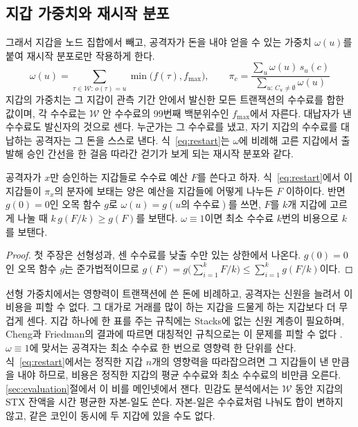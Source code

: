 \subsection{지갑 가중치와 재시작 분포}
\label{sec:method-weights}

그래서 지갑을 노드 집합에서 빼고, 공격자가 돈을 내야 얻을 수 있는 가중치 $\omega(u)$를 붙여 재시작 분포로만 작용하게 한다.
\begin{equation}
\label{eq:restart}
\omega(u)=\sum_{\tau\in\mathcal{W}:\,o(\tau)=u}\min\bigl(f(\tau),f_{\max}\bigr),
\qquad
\pi_c=\frac{\sum_{u}\omega(u)\,s_u(c)}{\sum_{u:\,C_u\neq\emptyset}\omega(u)}
\end{equation}
지갑의 가중치는 그 지갑이 관측 기간 안에서 발신한 모든 트랜잭션의 수수료를 합한 값이며, 각 수수료는 $\mathcal{W}$ 안 수수료의 99번째 백분위수인 $f_{\max}$에서 자른다. 대납자가 낸 수수료도 발신자의 것으로 센다. 누군가는 그 수수료를 냈고, 자기 지갑의 수수료를 대납하는 공격자는 그 돈을 스스로 낸다. 식~\eqref{eq:restart}는 $\omega$에 비례해 고른 지갑에서 출발해 승인 간선을 한 걸음 따라간 걷기가 보게 되는 재시작 분포와 같다.

\begin{proposition}
\label{prop:split}
공격자가 $x$만 승인하는 지갑들로 수수료 예산 $F$를 쓴다고 하자. 식~\eqref{eq:restart}에서 이 지갑들이 $\pi_x$의 분자에 보태는 양은 예산을 지갑들에 어떻게 나누든 $F$ 이하이다. 반면 $g(0)=0$인 오목 함수 $g$로 $\omega(u)=g(u\text{의 수수료})$를 쓰면, $F$를 $k$개 지갑에 고르게 나눌 때 $k\,g(F/k)\geq g(F)$를 보탠다. $\omega\equiv 1$이면 최소 수수료 $k$번의 비용으로 $k$를 보탠다.
\end{proposition}

\begin{proof}
첫 주장은 선형성과, 센 수수료를 낮출 수만 있는 상한에서 나온다. $g(0)=0$인 오목 함수 $g$는 준가법적이므로 $g(F)=g\bigl(\sum_{i=1}^{k}F/k\bigr)\leq\sum_{i=1}^{k}g(F/k)$이다.
\end{proof}

선형 가중치에서는 영향력이 트랜잭션에 쓴 돈에 비례하고, 공격자는 신원을 늘려서 이 비용을 피할 수 없다. 그 대가로 거래를 많이 하는 지갑을 드물게 하는 지갑보다 더 무겁게 센다. 지갑 하나에 한 표를 주는 규칙에는 Stacks에 없는 신원 계층이 필요하며, Cheng과 Friedman의 결과에 따르면 대칭적인 규칙으로는 이 문제를 피할 수 없다 \cite{cheng2005sybilproof}. $\omega\equiv1$에 맞서는 공격자는 최소 수수료 한 번으로 영향력 한 단위를 산다. 식~\eqref{eq:restart}에서는 정직한 지갑 $n$개의 영향력을 따라잡으려면 그 지갑들이 낸 만큼을 내야 하므로, 비용은 정직한 지갑의 평균 수수료와 최소 수수료의 비만큼 오른다. \ref{sec:evaluation}절에서 이 비를 메인넷에서 잰다. 민감도 분석에서는 $\mathcal{W}$ 동안 지갑의 STX 잔액을 시간 평균한 자본-일도 쓴다. 자본-일은 수수료처럼 나눠도 합이 변하지 않고, 같은 코인이 동시에 두 지갑에 있을 수도 없다.

